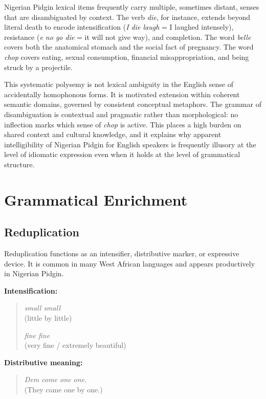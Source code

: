 \documentclass[12pt]{article}
\begin{document}
Nigerian Pidgin lexical items frequently carry multiple, sometimes distant, senses that are disambiguated by context. The verb \textit{die}, for instance, extends beyond literal death to encode intensification (\textit{I die laugh} = I laughed intensely), resistance (\textit{e no go die} = it will not give way), and completion. The word \textit{belle} covers both the anatomical stomach and the social fact of pregnancy. The word \textit{chop} covers eating, sexual consumption, financial misappropriation, and being struck by a projectile.

This systematic polysemy is not lexical ambiguity in the English sense of accidentally homophonous forms. It is motivated extension within coherent semantic domains, governed by consistent conceptual metaphors. The grammar of disambiguation is contextual and pragmatic rather than morphological: no inflection marks which sense of \textit{chop} is active. This places a high burden on shared context and cultural knowledge, and it explains why apparent intelligibility of Nigerian Pidgin for English speakers is frequently illusory at the level of idiomatic expression even when it holds at the level of grammatical structure.

\section{Grammatical Enrichment}

\subsection{Reduplication}

Reduplication functions as an intensifier, distributive marker, or expressive device. It is common in many West African languages and appears productively in Nigerian Pidgin.

\textbf{Intensification:}

\begin{quote}
\textit{small small} \\
(little by little)

\textit{fine fine} \\
(very fine / extremely beautiful)
\end{quote}

\textbf{Distributive meaning:}

\begin{quote}
\textit{Dem come one one.} \\
(They came one by one.)
\end{quote}
\end{document}
